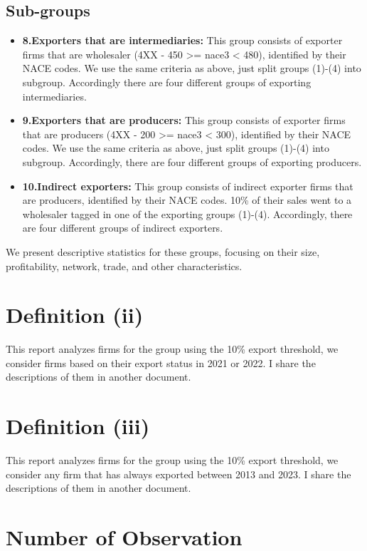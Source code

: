 \documentclass{article}
\begin{document}
\subsection*{Sub-groups}
\begin{itemize}
    \item \textbf{8.Exporters that are intermediaries:} This group consists of exporter firms that are wholesaler (4XX - 450 >= nace3 < 480), identified by their NACE codes. We use the same criteria as above, just split groups (1)-(4) into subgroup. Accordingly there are four different groups of exporting intermediaries.
    \item \textbf{9.Exporters that are producers:} This group consists of exporter firms that are producers (4XX - 200 >= nace3 < 300), identified by their NACE codes. We use the same criteria as above, just split groups (1)-(4) into subgroup. Accordingly, there are four different groups of exporting producers.
    \item \textbf{10.Indirect exporters:} This group consists of indirect exporter firms that are producers, identified by their NACE codes. 10\% of their sales went to a wholesaler tagged in one of the exporting groups (1)-(4). Accordingly, there are four different groups of indirect exporters.
\end{itemize}

We present descriptive statistics for these groups, focusing on their size, profitability, network, trade, and other characteristics.

\section*{Definition (ii)}
This report analyzes firms for the group using the 10\% export threshold, we consider firms based on their export status in 2021 or 2022. I share the descriptions of them in another document.

\section*{Definition (iii)}
This report analyzes firms for the group using the 10\% export threshold, we consider any firm that has always exported between 2013 and 2023. I share the descriptions of them in another document.

\section{Number of Observation}
\end{document}
